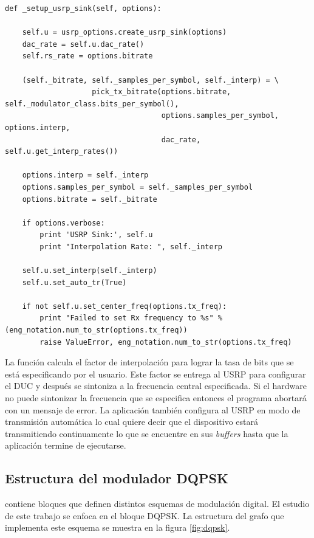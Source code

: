 \begin{lstlisting}[float, label=ex:usrptxsetup, caption={Funci\'on que configura el USRP como
transmisor}, breaklines=true]
def _setup_usrp_sink(self, options):

    self.u = usrp_options.create_usrp_sink(options)
    dac_rate = self.u.dac_rate()
    self.rs_rate = options.bitrate
        
    (self._bitrate, self._samples_per_symbol, self._interp) = \
                    pick_tx_bitrate(options.bitrate, self._modulator_class.bits_per_symbol(),
                                    options.samples_per_symbol, options.interp,
                                    dac_rate, self.u.get_interp_rates())

    options.interp = self._interp
    options.samples_per_symbol = self._samples_per_symbol
    options.bitrate = self._bitrate

    if options.verbose:
        print 'USRP Sink:', self.u
        print "Interpolation Rate: ", self._interp
    
    self.u.set_interp(self._interp)
    self.u.set_auto_tr(True)

    if not self.u.set_center_freq(options.tx_freq):
        print "Failed to set Rx frequency to %s" % (eng_notation.num_to_str(options.tx_freq))
        raise ValueError, eng_notation.num_to_str(options.tx_freq)
\end{lstlisting}

La funci\'on calcula el factor de interpolaci\'on para lograr la tasa de bits que se est\'a
especificando por el usuario. Este factor se entrega al USRP para configurar el DUC y despu\'es se
sintoniza a la frecuencia central especificada. Si el hardware no puede sintonizar la frecuencia que
se especifica entonces el programa abortar\'a con un mensaje de error. La aplicaci\'on tambi\'en
configura al USRP en modo de transmisi\'on autom\'atica lo cual quiere decir que el dispositivo
estar\'a transmitiendo continuamente lo que se encuentre en sus \emph{buffers} hasta que la aplicaci\'on
termine de ejecutarse.

\subsection{Estructura del modulador DQPSK}\label{subsec:estrucdqpsk}
\gnuradio contiene bloques que definen distintos esquemas de modulaci\'on digital. El estudio de
este trabajo se enfoca en el bloque DQPSK. La estructura del grafo que implementa este esquema se
muestra en la figura \ref{fig:dqpsk}.

